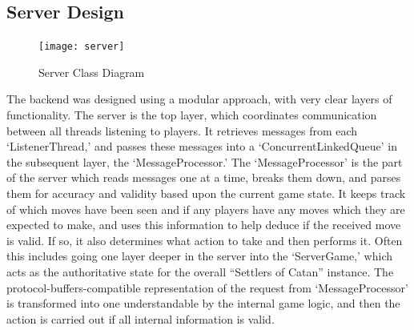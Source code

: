 \documentclass[a4paper,doc,draftfirst]{apa6}
\begin{document}
\subsection{Server Design}
\begin{figure}[hbtp]
      \texttt{[image: server]}
      \caption{Server Class Diagram}
\end{figure}
The backend was designed using a modular approach, with very clear layers of functionality. The server is the top layer, which coordinates communication between all threads listening to players. It retrieves messages from each ‘ListenerThread,’ and passes these messages into a ‘ConcurrentLinkedQueue’ in the subsequent layer, the ‘MessageProcessor.’ The ‘MessageProcessor’ is the part of the server which reads messages one at a time, breaks them down, and parses them for accuracy and validity based upon the current game state. It keeps track of which moves have been seen and if any players have any moves which they are expected to make, and uses this information to help deduce if the received move is valid. If so, it also determines what action to take and then performs it. Often this includes going one layer deeper in the server into the ‘ServerGame,’ which acts as the authoritative state for the overall “Settlers of Catan” instance. The protocol-buffers-compatible representation of the request from ‘MessageProcessor’ is transformed into one understandable by the internal game logic, and then the action is carried out if all internal information is valid.
\end{document}
